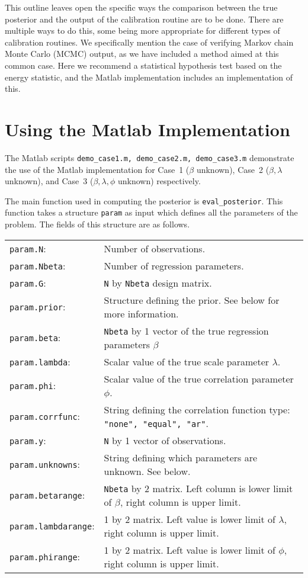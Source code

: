 \documentclass{book}
\begin{document}
This outline leaves open the specific ways the comparison between the true posterior and the output of the calibration
routine are to be done. There are multiple ways to do this, some being more appropriate for different types of calibration
routines. We specifically mention the case of verifying Markov chain Monte Carlo (MCMC) output, as we have included 
a method aimed at this common case. Here we recommend a statistical hypothesis test based on the energy statistic, and 
the Matlab implementation includes an implementation of this.

\chapter{Using the Matlab Implementation}
The Matlab scripts {\tt demo\_case1.m, demo\_case2.m, demo\_case3.m} demonstrate the use of the Matlab implementation
for Case~1 ($\beta$ unknown), Case~2 ($\beta, \lambda$ unknown), and Case~3 ($\beta, \lambda, \phi$ unknown) respectively.

The main function used in computing the posterior is {\tt eval\_posterior}. This function takes a structure {\tt param} as input
which defines all the parameters of the problem. The fields of this structure are as follows.

\vspace{.1in}
\begin{tabular}{l l}
{\tt param.N}: & Number of observations. \\
{\tt param.Nbeta}: & Number of regression parameters. \\
{\tt param.G}:  & {\tt N} by {\tt Nbeta} design matrix. \\
{\tt param.prior}: & Structure defining the prior. See below for more information. \\
{\tt param.beta}: & {\tt Nbeta} by 1 vector of the true regression parameters $\beta$ \\
{\tt param.lambda}: & Scalar value of the true scale parameter $\lambda$. \\
{\tt param.phi}: & Scalar value of the true correlation parameter $\phi$. \\  
{\tt param.corrfunc}: & String defining the correlation function type: {\tt "none", "equal", "ar"}. \\
{\tt param.y}: & {\tt N} by 1 vector of observations. \\
{\tt param.unknowns}: & String defining which parameters are unknown. See below. \\
{\tt param.betarange}: & {\tt Nbeta} by 2 matrix. Left column is lower limit of $\beta$, right column is upper limit. \\
{\tt param.lambdarange}: & 1 by 2 matrix. Left value is lower limit of $\lambda$, right column is upper limit. \\
{\tt param.phirange}: & 1 by 2 matrix. Left value is lower limit of $\phi$, right column is upper limit. \\
\end{tabular}
\end{document}
